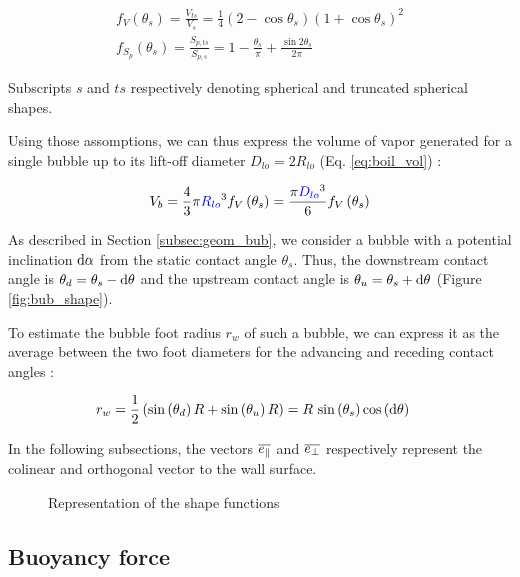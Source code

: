\begin{align}
f_{V}\left(\theta_{s}\right)=\frac{V_{ts}}{V_{s}}=\frac{1}{4}\left(2-\cos{\theta_{s}}\right)\left(1+\cos{\theta_{s}}\right)^{2}\\
f_{S_{p}}\left(\theta_{s}\right)=\frac{S_{p,ts}}{S_{p,s}}=1-\frac{\theta_{s}}{\pi}+\frac{\sin{2\theta_{s}}}{2\pi}
\end{align}

Subscripts $s$ and $ts$ respectively denoting spherical and truncated spherical shapes.


\npar

Using those assomptions, we can thus express the volume of vapor generated for a single bubble up to its lift-off diameter $D_{lo}=2R_{lo}$ (Eq. \ref{eq:boil_vol}) :

\begin{align}
\label{eq:boil_vol}
V_{b}=\frac{4}{3}\pi \bluemath{R_{lo}}^{3} f_{V}\parth{\theta_{s}} = \frac{\pi \bluemath{D_{lo}}^{3}}{6} f_{V}\parth{\theta_{s}}
\end{align}

As described in Section \ref{subsec:geom_bub}, we consider a bubble with a potential inclination $\text{d}\alpha$ from the static contact angle $\theta_{s}$. Thus, the downstream contact angle is $\theta_{d}=\theta_{s} - \mathrm{d}\theta$ and the upstream contact angle is $\theta_{u}=\theta_{s} + \mathrm{d}\theta$ (Figure \ref{fig:bub_shape}).

\npar

To estimate the bubble foot radius $r_{w}$ of such a bubble, we can express it as the average between the two foot diameters for the advancing and receding contact angles :

\begin{align}
r_{w} &= \frac{1}{2}\left( \mathrm{sin}\left( \theta_{d} \right)R + \mathrm{sin}\left( \theta_{u} \right)R \right) = R~\mathrm{sin}\left( \theta_{s} \right)\mathrm{cos}\left( \mathrm{d}\theta \right)
\end{align}

\npar

In the following subsections, the vectors $\overline{e_{\|}}$ and $\overline{e_{\bot}}$ respectively represent the colinear and orthogonal vector to the wall surface.


\begin{figure}[h!]


\caption{Representation of the shape functions}
\end{figure}


\subsection{Buoyancy force}

